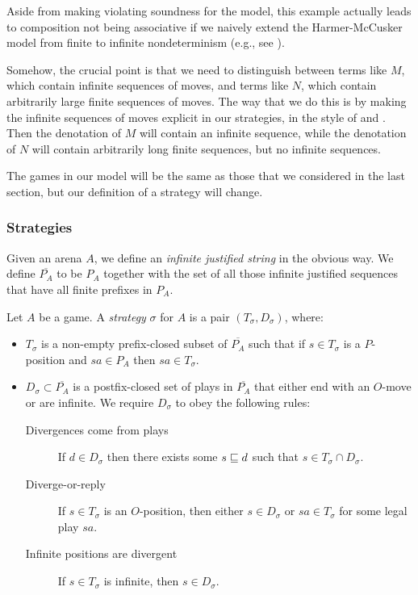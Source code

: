 \documentclass[sigplan,10pt,review]{acmart}\settopmatter{printfolios=true,printccs=false,printacmref=false}
\begin{document}
Aside from making violating soundness for the model, this example actually leads to composition not being associative if we naively extend the Harmer-McCusker model from finite to infinite nondeterminism (e.g., see \cite[4.4.1]{RusssThesis}).  

Somehow, the crucial point is that we need to distinguish between terms like $M$, which contain infinite sequences of moves, and terms like $N$, which contain arbitrarily large finite sequences of moves.  
The way that we do this is by making the infinite sequences of moves explicit in our strategies, in the style of \cite{RoscoeCspInfinite} and \cite{LevyGsInfinite}.  
Then the denotation of $M$ will contain an infinite sequence, while the denotation of $N$ will contain arbitrarily long finite sequences, but no infinite sequences.  

The games in our model will be the same as those that we considered in the last section, but our definition of a strategy will change.

\subsubsection{Strategies}

Given an arena $A$, we define an \emph{infinite justified string} in the obvious way.  
We define $\overline{P_A}$ to be $P_A$ together with the set of all those infinite justified sequences that have all finite prefixes in $P_A$.

Let $A$ be a game.  
A \emph{strategy} $\sigma$ for $A$ is a pair $(T_\sigma,D_\sigma)$, where:
\begin{itemize}
  \item $T_\sigma$ is a non-empty prefix-closed subset of $\overline{P_A}$ such that if $s\in T_\sigma$ is a $P$-position and $sa\in P_A$ then $sa\in T_\sigma$.
  \item $D_\sigma\subset \overline{P_A}$ is a postfix-closed set of plays in $\overline{P_A}$ that either end with an $O$-move or are infinite.  
    We require $D_\sigma$ to obey the following rules:
    \begin{description}
      \item[Divergences come from plays] If $d\in D_\sigma$ then there exists some $s\sqsubseteq d$ such that $s\in T_\sigma\cap D_\sigma$.
      \item[Diverge-or-reply] If $s\in T_\sigma$ is an $O$-position, then either $s\in D_\sigma$ or $sa\in T_\sigma$ for some legal play $sa$.
      \item[Infinite positions are divergent] If $s\in T_\sigma$ is infinite, then $s\in D_\sigma$.
    \end{description}
\end{itemize}
\end{document}
